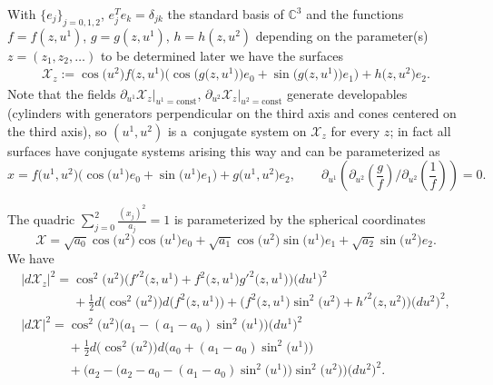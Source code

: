 \documentclass[pdftex]{sigma}
\begin{document}
With $\{e_j\}_{j=0,1,2}$, $e_j^Te_k=\delta_{jk}$ the standard basis
of $\mathbb{C}^3$  and the functions $f=f(z,u^1)$, $g=g(z,u^1)$,
$h=h(z,u^2)$ depending on the parameter(s) $z=(z_1,z_2,\dots )$ to be
determined later we have the surfaces
\begin{gather}
\mathcal{X}_z:=\cos\big(u^2\big)f\big(z,u^1\big)\big(\cos\big(g\big(z,u^1\big)\big)e_0+\sin
\big(g\big(z,u^1\big)\big)e_1\big)+h\big(z,u^2\big)e_2.
\label{eq:surf}
\end{gather}
Note that the f\/ields
$\partial_{u^1}\mathcal{X}_z|_{u^1=\mathrm{const}}$,
$\partial_{u^2}\mathcal{X}_z|_{u^2=\mathrm{const}}$ generate developables
(cylinders with gene\-ra\-tors perpendicular on the third axis and
cones centered on the third axis), so $(u^1,u^2)$ is a~conjugate
system on $\mathcal{X}_z$ for every $z$; in fact all surfaces have
conjugate systems arising this way and can be parameterized as
\[
x=f\big(u^1,u^2\big)\big(\cos\big(u^1\big)e_0+\sin\big(u^1\big)e_1\big)+g\big(u^1,u^2\big)e_2, \qquad
\partial_{u^1}\left(\partial_{u^2}\left(\frac{g}{f}\right){\Big/}\partial_{u^2}\left(\frac{1}{f}\right)\right)=0.
\]

The quadric $\sum\limits_{j=0}^2\frac{(x_j)^2}{a_j}=1$ is parameterized
by the spherical coordinates
\[
\mathcal{X}=\sqrt{a_0}\cos\big(u^2\big)\cos\big(u^1\big)e_0
+\sqrt{a_1}\cos\big(u^2\big)\sin\big(u^1\big)e_1+\sqrt{a_2}\sin\big(u^2\big)e_2.
\]
We have
\begin{gather*}
|d\mathcal{X}_z|^2=\cos^2\big(u^2\big)\big(f'^2\big(z,u^1\big)
+f^2\big(z,u^1\big)g'^2\big(z,u^1\big)\big)\big(du^1\big)^2
\\
\phantom{|d\mathcal{X}_z|^2=}{}
+\tfrac{1}{2}d\big(\cos^2\big(u^2\big)\big)d\big(f^2\big(z,u^1\big)\big)
+\big(f^2\big(z,u^1\big)\sin^2\big(u^2\big)+h'^2\big(z,u^2\big)\big)\big(du^2\big)^2,
\\
|d\mathcal{X}|^2
=\cos^2\big(u^2\big)\big(a_1-(a_1-a_0)\sin^2\big(u^1\big)\big)\big(du^1\big)^2\\
\phantom{|d\mathcal{X}|^2=}{}
+\tfrac{1}{2}d\big(\cos^2\big(u^2\big)\big)
d\big(a_0+(a_1-a_0)\sin^2\big(u^1\big)\big)
\\
\phantom{|d\mathcal{X}|^2=}{}
+\big(a_2-\big(a_2-a_0-(a_1-a_0)\sin^2\big(u^1\big)\big)\sin^2\big(u^2\big)\big)\big(du^2\big)^2.
\end{gather*}
\end{document}
